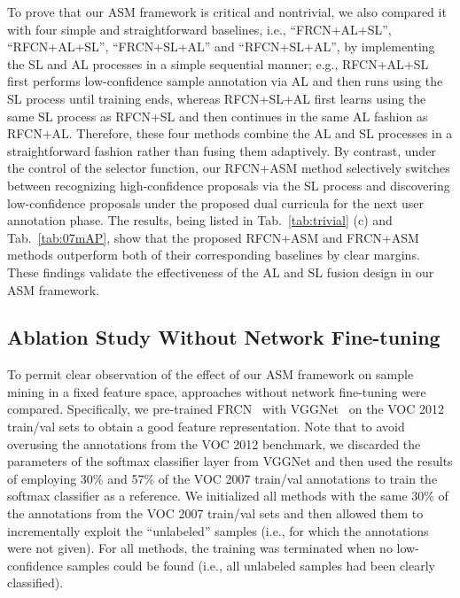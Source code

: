 \documentclass[journal]{IEEEtran}
\begin{document}
{To prove that our {ASM framework} is critical and nontrivial, we also compared it with four simple and straightforward baselines, i.e., ``FRCN+AL+SL'', ``RFCN+AL+SL'', ``FRCN+SL+AL'' and ``RFCN+SL+AL'', by implementing the SL and AL processes in a simple sequential manner; e.g., RFCN+AL+SL first performs low-confidence sample annotation via AL and then runs using the SL process until training ends, whereas RFCN+SL+AL first learns using the same SL process as RFCN+SL and then continues in the same AL fashion as RFCN+AL. Therefore, these four methods combine the AL and SL processes {in a straightforward fashion rather than fusing them adaptively}. By contrast, under the control of the selector function, our RFCN+{ASM} method {selectively} switches between recognizing high-confidence proposals via the SL process and discovering low-confidence proposals under the proposed dual curricula for the next user annotation phase. The results, being listed in Tab.~\ref{tab:trivial} (c) and Tab.~\ref{tab:07mAP}, show that the proposed RFCN+{ASM} and FRCN+{ASM} methods outperform both of their corresponding baselines by clear margins. These findings validate the effectiveness of the AL and SL fusion design in our {ASM} framework.   

\subsection{Ablation Study Without Network Fine-tuning}
To {permit clear observation of} the effect of our {ASM} framework on sample mining in a fixed feature space, approaches without network fine-tuning were compared. Specifically, we pre-trained FRCN~\cite{frcn} with VGGNet~\cite{vgg} on the VOC 2012 train/val sets to obtain a good feature representation. Note that to avoid overusing the annotations from the VOC 2012 benchmark, we discarded the parameters of the softmax classifier layer from VGGNet and then used the results of employing 30\% and 57\% of the VOC 2007 train/val annotations to train the softmax classifier as a reference.  We initialized all methods with the same 30\% of the annotations from the VOC 2007 train/val sets and then allowed them to incrementally exploit the ``unlabeled'' samples (i.e., for which the annotations were not given). For all methods, the training was terminated when no low-confidence samples could be found (i.e., all unlabeled samples {had} been clearly classified).

}
\end{document}

